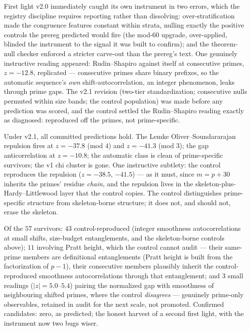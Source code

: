 \documentclass[11pt]{article}
\theoremstyle{remark}
\begin{document}
First light v2.0 immediately caught its own instrument in two errors, which the registry
discipline requires reporting rather than dissolving: over-stratification made the congruence
features constant within strata, nulling exactly the positive controls the prereg predicted would
fire (the mod-$60$ upgrade, over-applied, blinded the instrument to the signal it was built to
confirm); and the theorem-null checker enforced a stricter carve-out than the prereg's text. One
genuinely instructive reading appeared: Rudin--Shapiro against itself at consecutive primes,
$z = -12.8$, replicated --- consecutive primes share binary prefixes, so the automatic sequence's
\emph{own} shift-autocorrelation, an integer phenomenon, leaks through prime gaps. The v2.1
revision (two-tier standardization; consecutive nulls permuted within size bands; the control
population) was made before any prediction was scored, and the control settled the
Rudin--Shapiro reading exactly as diagnosed: reproduced off the primes, not prime-specific.

Under v2.1, all committed predictions hold. The Lemke Oliver--Soundararajan repulsion \cite{LOS}
fires at $z = -37.8$ (mod $4$) and $z = -41.3$ (mod $3$); the gap anticorrelation at $z = -10.8$; the automatic class is clean of
prime-specific survivors; the v1 chi cluster is gone. One instructive subtlety: the control
reproduces the repulsion ($z = -38.5$, $-41.5$) --- as it must, since $m = p + 30$ inherits the
primes' residue \emph{chain}, and the repulsion lives in the skeleton-plus-Hardy--Littlewood
layer that the control copies. The control distinguishes prime-specific structure from
skeleton-borne structure; it does not, and should not, erase the skeleton.

Of the $57$ survivors: $43$ control-reproduced (integer smoothness autocorrelations at small
shifts, size-budget entanglements, and the skeleton-borne controls above); $11$ involving Pratt
height, which the control cannot audit --- their same-prime members are definitional
entanglements (Pratt height is built from the factorization of $p - 1$), their consecutive
members plausibly inherit the control-reproduced smoothness autocorrelations through that
entanglement; and $3$ small readings ($|z| = 5.0$--$5.4$) pairing the normalized gap with
smoothness of neighbouring shifted primes, where the control \emph{disagrees} --- genuinely
prime-only observables, retained in audit for the next scale, not promoted. Confirmed candidates:
zero, as predicted; the honest harvest of a second first light, with the instrument now two bugs
wiser.
\end{document}
